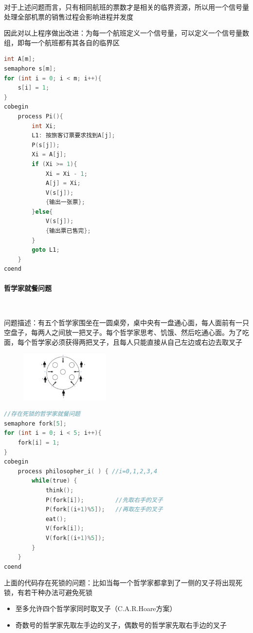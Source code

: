 \documentclass[cs4size,a4paper,10pt]{ctexart}
\begin{document}
	对于上述问题而言，只有相同航班的票数才是相关的临界资源，所以用一个信号量处理全部机票的销售过程会影响进程并发度

	因此对以上程序做出改进：为每一个航班定义一个信号量，可以定义一个信号量数组，即每一个航班都有其各自的临界区

	\begin{lstlisting}[language=C, keywordstyle=\color{black}]
int A[m];
semaphore s[m];
for (int i = 0; i < m; i++){
	s[i] = 1;
}
cobegin
	process Pi(){
		int Xi;
		L1: 按旅客订票要求找到A[j];
		P(s[j]);
		Xi = A[j];
		if (Xi >= 1){
			Xi = Xi - 1;
			A[j] = Xi;
			V(s[j]);
			{输出一张票};
		}else{
			V(s[j]);
			{输出票已售完};
		}
		goto L1;
	}
coend
	\end{lstlisting}

	\paragraph{哲学家就餐问题}~{}

	问题描述：有五个哲学家围坐在一圆桌旁，桌中央有一盘通心面，每人面前有一只空盘子，每两人之间放一把叉子。每个哲学家思考、饥饿、然后吃通心面。为了吃面，每个哲学家必须获得两把叉子，且每人只能直接从自己左边或右边去取叉子

	\begin{figure}[H]
		\centering
		\includegraphics[width=0.4\textwidth]{img/哲学家就餐问题描述.pdf}
	\end{figure}

	\begin{lstlisting}[language=C, keywordstyle=\color{black}]
//存在死锁的哲学家就餐问题
semaphore fork[5];
for (int i = 0; i < 5; i++){
	fork[i] = 1;
}
cobegin
	process philosopher_i( ) { //i=0,1,2,3,4
		while(true) {
			think();
			P(fork[i]); 		//先取右手的叉子
			P(fork[(i+1)%5]); 	//再取左手的叉子
			eat();
			V(fork[i]);
			V(fork[(i+1)%5]);
		}
	}
coend	
	\end{lstlisting}
	上面的代码存在死锁的问题：比如当每一个哲学家都拿到了一侧的叉子将出现死锁，有若干种办法可避免死锁
	\begin{itemize}
		\item 至多允许四个哲学家同时取叉子（C.A.R.Hoare方案）
		\item 奇数号的哲学家先取左手边的叉子，偶数号的哲学家先取右手边的叉子
	\end{itemize}
\end{document}
